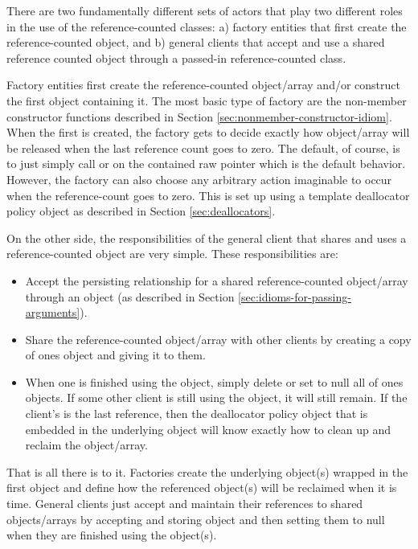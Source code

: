\documentclass[pdf,ps2pdf,11pt]{SANDreport}
\begin{document}
There are two fundamentally different sets of actors that play two
different roles in the use of the reference-counted classes: a)
factory entities that first create the reference-counted object, and
b) general clients that accept and use a shared reference counted
object through a passed-in reference-counted class.

Factory entities first create the reference-counted object/array
and/or construct the first {} object containing it.
The most basic type of factory are the non-member constructor
functions described in Section
{}\ref{sec:nonmember-constructor-idiom}.  When the first
{} is created, the factory gets to decide
exactly how object/array will be released when the last reference
count goes to zero.  The default, of course, is to just simply call
{} or {} on the contained raw pointer
which is the default behavior.  However, the factory can also choose
any arbitrary action imaginable to occur when the reference-count goes
to zero.  This is set up using a template deallocator policy object as
described in Section {}\ref{sec:deallocators}.

On the other side, the responsibilities of the general client that
shares and uses a reference-counted object are very simple.  These
responsibilities are:

\begin{itemize}

{}\item Accept the persisting relationship for a shared
reference-counted object/array through an {} object
(as described in Section {}\ref{sec:idioms-for-passing-arguments}).

{}\item Share the reference-counted object/array with other clients by
creating a copy of ones {} object and giving it to
them.

{}\item When one is finished using the object, simply delete or set to
null all of ones {} objects.  If some other client is
still using the object, it will still remain.  If the client's is the
last reference, then the deallocator policy object that is embedded in
the underlying {} object will know exactly how to
clean up and reclaim the object/array.

\end{itemize}

That is all there is to it.  Factories create the underlying object(s)
wrapped in the first {} object and define how the
referenced object(s) will be reclaimed when it is time.  General
clients just accept and maintain their references to shared
objects/arrays by accepting and storing {} object
and then setting them to null when they are finished using the
object(s).
\end{document}
